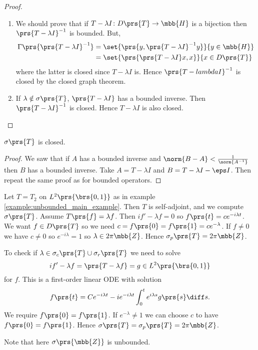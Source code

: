 \documentclass[10pt, twoside]{book}
\begin{document}
\begin{proof}
\begin{enumerate}
\item%
We should prove that if $T - \lambda I \colon D\prs{T} \to \mbb{H}$ is a bijection then $\prs{T-\lambda I}^{-1}$ is bounded. But,
\begin{align*}
\Gamma\prs{\prs{T-\lambda I}^{-1}} &= \set{\prs{y, \prs{T- \lambda I}^{-1} y}}{y \in \mbb{H}}
\\&= \set{\prs{\prs{T-\lambda I}x, x}}{x \in D\prs{T}}
\end{align*}
where the latter is closed since $T - \lambda I$ is. Hence $\prs{T-lambda I}^{-1}$ is closed by the closed graph theorem.
\item%
If $\lambda \notin \sigma\prs{T}$, $\prs{T-\lambda I}$ has a bounded inverse. Then $\prs{T - \lambda I}^{-1}$ is closed. Hence ${T- \lambda I}$ is also closed.
\end{enumerate}
\end{proof}

\begin{proposition}
$\sigma\prs{T}$ is closed.
\end{proposition}

\begin{proof}
We saw that if $A$ has a bounded inverse and $\norm{B - A} < \frac{1}{\norm{A^{-1}}}$ then $B$ has a bounded inverse. Take $A = T - \lambda I$ and $B = T - \lambda I - \eps I$. Then repeat the same proof as for bounded operators.
\end{proof}

\begin{example}
Let $T = T_2$ on $L^2\prs{\brs{0,1}}$ as in example \ref{example:unbounded_main_example}. Then $T$ is self-adjoint, and we compute $\sigma\prs{T}$.
Assume $T\prs{f} = \lambda f$. Then $i f' - \lambda f = 0$ so $f\prs{t} = c e^{-i \lambda t}$. We want $f \in D\prs{T}$ so we need $c = f\prs{0} = f\prs{1} = c e^{-\lambda}$. If $f \neq 0$ we have $c \neq 0$ so $e^{-i\lambda} = 1$ so $\lambda \in 2 \pi \mbb{Z}$.
Hence $\sigma_p\prs{T} = 2 \pi \mbb{Z}$.

To check if $\lambda \in \sigma_c\prs{T} \cup \sigma_r\prs{T}$ we need to solve
\[i f' - \lambda f = \prs{T- \lambda f} = g \in L^2\prs{\brs{0,1}}\]
for $f$.
This is a first-order linear ODE with solution
\[f\prs{t} = C e^{-i\lambda t} - ie^{-i\lambda t} \int_0^t e^{i \lambda s} g\prs{s} \diff s \text{.}\]
We require $f\prs{0} = f\prs{1}$. If $e^{-\lambda} \neq 1$ we can choose $c$ to have $f\prs{0} = f\prs{1}$.
Hence $\sigma\prs{T} = \sigma_p\prs{T} = 2 \pi \mbb{Z}$.

Note that here $\sigma\prs{\mbb{Z}}$ is unbounded.
\end{example}
\end{document}

